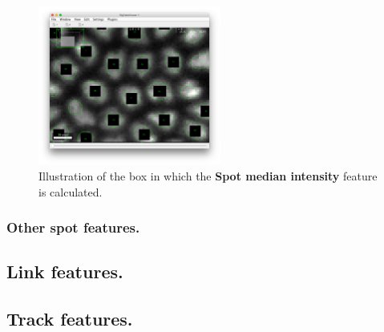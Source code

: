 \begin{figure}
    \centering
    \includegraphics[width=6cm]{figures/Mastodon_Median-feature-pixels.png}
    \caption{Illustration of the box in which the \textbf{Spot median intensity} feature is calculated.}
    \label{fig:SpotMedianBox}
\end{figure}

\subsubsection{Other spot features.}


\subsection{Link features.}

\subsection{Track features.}